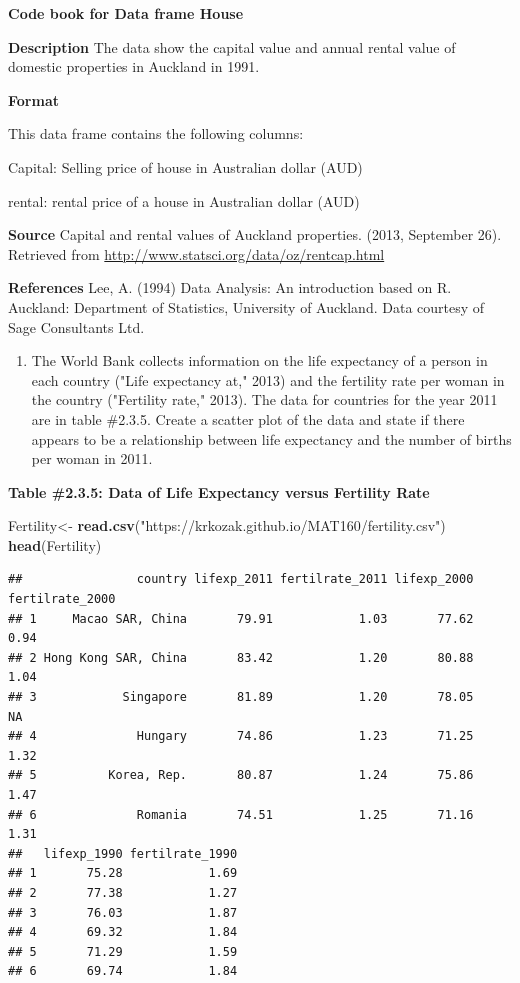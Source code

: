 \documentclass[
]{book}
\newenvironment{Shaded}{\begin{snugshade}}{\end{snugshade}}
\newcommand{\KeywordTok}[1]{\textcolor[rgb]{0.13,0.29,0.53}{\textbf{#1}}}
\newcommand{\NormalTok}[1]{#1}
\newcommand{\StringTok}[1]{\textcolor[rgb]{0.31,0.60,0.02}{#1}}
\providecommand{\tightlist}{%
  \setlength{\itemsep}{0pt}\setlength{\parskip}{0pt}}
\begin{document}
\textbf{Code book for Data frame House}

\textbf{Description}
The data show the capital value and annual rental value of domestic properties in Auckland in 1991.

\textbf{Format}

This data frame contains the following columns:

Capital: Selling price of house in Australian dollar (AUD)

rental: rental price of a house in Australian dollar (AUD)

\textbf{Source}
Capital and rental values of Auckland properties. (2013, September 26). Retrieved from
\url{http://www.statsci.org/data/oz/rentcap.html}

\textbf{References}
Lee, A. (1994) Data Analysis: An introduction based on R. Auckland: Department of Statistics, University of Auckland. Data courtesy of Sage Consultants Ltd.

\begin{enumerate}
\def\labelenumi{\arabic{enumi}.}
\setcounter{enumi}{2}
\tightlist
\item
  The World Bank collects information on the life expectancy of a person in each country ("Life expectancy at," 2013) and the fertility rate per woman in the country ("Fertility rate," 2013). The data for countries for the year 2011 are in table \#2.3.5. Create a scatter plot of the data and state if there appears to be a relationship between life expectancy and the number of births per woman in 2011.
\end{enumerate}

\textbf{Table \#2.3.5: Data of Life Expectancy versus Fertility Rate}

\begin{Shaded}
\begin{Highlighting}[]
\NormalTok{Fertility<-}\StringTok{ }\KeywordTok{read.csv}\NormalTok{(}\StringTok{"https://krkozak.github.io/MAT160/fertility.csv"}\NormalTok{)}
\KeywordTok{head}\NormalTok{(Fertility)}
\end{Highlighting}
\end{Shaded}

\begin{verbatim}
##                country lifexp_2011 fertilrate_2011 lifexp_2000 fertilrate_2000
## 1     Macao SAR, China       79.91            1.03       77.62            0.94
## 2 Hong Kong SAR, China       83.42            1.20       80.88            1.04
## 3            Singapore       81.89            1.20       78.05              NA
## 4              Hungary       74.86            1.23       71.25            1.32
## 5          Korea, Rep.       80.87            1.24       75.86            1.47
## 6              Romania       74.51            1.25       71.16            1.31
##   lifexp_1990 fertilrate_1990
## 1       75.28            1.69
## 2       77.38            1.27
## 3       76.03            1.87
## 4       69.32            1.84
## 5       71.29            1.59
## 6       69.74            1.84
\end{verbatim}
\end{document}
